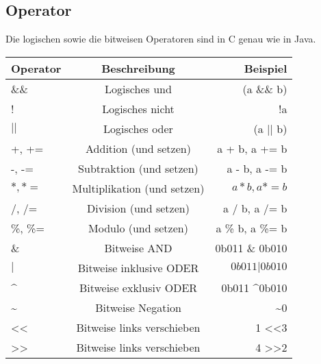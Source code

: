 \documentclass{article}
\begin{document}
\subsection{Operator}
Die logischen sowie die bitweisen Operatoren sind in C genau wie in Java.
\begin{center}
\begin{tabular}{| l | c | r |}
	\hline
	\textbf{Operator} & \textbf{Beschreibung} &  \textbf{Beispiel} \\ \hline
    \&\& & Logisches und & (a \&\& b)\\
    ! & Logisches nicht & !a\\
	\begin{math}
    \vert\vert \end{math} & Logisches oder & (a \begin{math}
    \vert\vert \end{math} b)\\
    +, += & Addition (und setzen)& a + b, a += b\\
    -, -= & Subtraktion (und setzen)& a - b, a -= b\\
    \begin{math} *, *=\end{math} & Multiplikation (und setzen)& \begin{math} a * b, a *= b\end{math}\\
    /, /= & Division (und setzen)& a / b, a /= b\\
    \%, \%= & Modulo (und setzen)& a \% b, a \%= b\\
    \& & Bitweise AND & 0b011 \& 0b010\\
\begin{math}| \end{math}& Bitweise inklusive ODER &\begin{math}0b011 | 0b010\end{math}\\
\textasciicircum & Bitweise exklusiv ODER & 0b011 \textasciicircum 0b010 \\
\textasciitilde & Bitweise Negation & \textasciitilde0\\
\textless\textless & Bitweise links verschieben & 1 \textless\textless 3\\
\textgreater\textgreater & Bitweise links verschieben & 4 \textgreater\textgreater 2\\
	\hline
\end{tabular}
\end{center}
\end{document}
